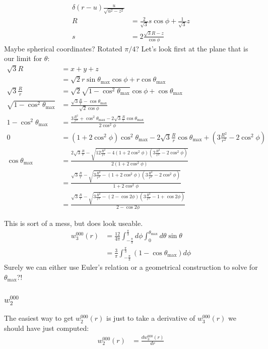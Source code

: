\documentclass[letterpaper,twocolumn,amsmath,amssymb,pre]{revtex4-1}
\newcommand\thetamax{\theta_{\text{max}}}
\begin{document}
\begin{widetext}
\begin{align}
  \delta(r-u)\frac{u}{\sqrt{u^2-z^2}}
  \\
  R &= \frac{2}{\sqrt{3}}s\cos\phi + \frac{1}{\sqrt{3}}z \\
  s &= 2\frac{\sqrt{3}R-z}{\cos\phi}
\end{align}
Maybe spherical coordinates? Rotated $\pi/4$? Let's look first at the
plane that is our limit for $\theta$:
\begin{align}
  \sqrt{3}R &= x + y + z \\
  &= \sqrt{2}r\sin\thetamax\cos\phi +
  r\cos\thetamax
  \\
  \sqrt{3}\frac{R}{r} &=
  \sqrt{2}\sqrt{1-\cos^2\thetamax}\cos\phi
  + \cos\thetamax
  \\
  \sqrt{1-\cos^2\thetamax} &=
  \frac{\sqrt{3}\frac{R}{r}-\cos\thetamax}{\sqrt{2}\cos\phi}
  \\
  1-\cos^2\thetamax &=
  \frac{3\frac{R^2}{r^2}+\cos^2\thetamax -
    2\sqrt{3}\frac{R}{r}\cos\thetamax}{2\cos^2\phi}
  \\
  0 &=
  (1+2\cos^2\phi)\cos^2\thetamax
  - 2\sqrt{3}\frac{R}{r}\cos\thetamax
  + \left(3\frac{R^2}{r^2} - 2\cos^2\phi\right)
  \\
  \cos\thetamax &= \frac{2\sqrt{3}\frac{R}{r}
  - \sqrt{12\frac{R^2}{r^2} - 4(1+2\cos^2\phi)\left(3\frac{R^2}{r^2}-2\cos^2\phi\right)}}{2(1+2\cos^2\phi)}
  \\
  &= \frac{\sqrt{3}\frac{R}{r}
  - \sqrt{3\frac{R^2}{r^2} -
    (1+2\cos^2\phi)\left(3\frac{R^2}{r^2}-2\cos^2\phi\right)}}{1+2\cos^2\phi}
  \\
  &= \frac{\sqrt{3}\frac{R}{r}
  - \sqrt{3\frac{R^2}{r^2} - (2-\cos2\phi)\left(3\frac{R^2}{r^2}-1+\cos2\phi\right)}}{2-\cos2\phi}
\end{align}
\end{widetext}
This is sort of a mess, but does look useable.
\begin{align}
  w_3^{000}(r) &=
  \frac{12}{4\pi}
  \int_{-\frac{\pi}{3}}^{\frac{\pi}{3}}d\phi
  \int_0^{\thetamax}d\theta
  \sin\theta
  \\
  &=
  \frac{3}{\pi}
  \int_{-\frac{\pi}{3}}^{\frac{\pi}{3}}
  (1 - \cos\thetamax)d\phi
\end{align}
Surely we can either use Euler's relation or a geometrical
construction to solve for $\thetamax$?!

\subsubsection{$w_2^{000}$}
The easiest way to get $w_2^{000}(r)$ is just to take a derivative of
$w_3^{000}(r)$ we should have just computed:
\begin{align}
  w_2^{000}(r) &= \frac{dw_3^{000}(r)}{dr}
\end{align}
\end{document}
